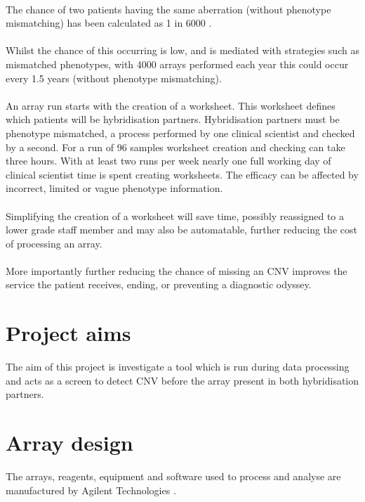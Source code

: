 \paragraph*{}
The chance of two patients having the same aberration (without phenotype mismatching) has been calculated as 1 in 6000 \cite{joowook_ahn_frequency_2015}.
\paragraph*{}
Whilst the chance of this occurring is low, and is mediated with strategies such as mismatched phenotypes, with 4000 arrays performed each year this could occur every 1.5 years (without phenotype mismatching). 
\paragraph*{}
An array run starts with the creation of a worksheet. This worksheet defines which patients will be hybridisation partners.  Hybridisation partners must be phenotype mismatched, a process performed by one clinical scientist and checked by a second. For a run of 96 samples worksheet creation and checking can take three hours. With at least two runs per week nearly one full working day of clinical scientist time is spent creating worksheets.
The efficacy can be affected by incorrect, limited or vague phenotype information.
\paragraph*{}
Simplifying the creation of a worksheet will save time, possibly reassigned to a lower grade staff member and may also be automatable, further reducing the cost of processing an array.
\paragraph*{}
More importantly further reducing the chance of missing an CNV improves the service the patient receives, ending, or preventing a diagnostic odyssey.

\section{Project aims}
The aim of this project is investigate a tool which is run during data processing and acts as a screen to detect CNV before the array present in both hybridisation partners.

\section{Array design}
The arrays, reagents, equipment and software used to process and analyse are manufactured by Agilent Technologies \cite{agilenttechnologies_microarrays}.
